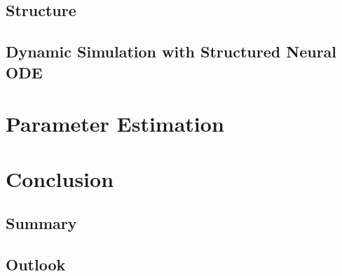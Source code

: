 \documentclass[
	parskip, 			   %
	twoside, 			   %
	DIV=14, 			   %
	BCOR=15.0mm, 		   %
	headsepline, 		   %
	open=right, 		   %
	captions=tableheading, %
	bibliography=totoc,    %
	numbers=noenddot       %
]{scrreprt}
\begin{document}
\section{Structure}
\section{Dynamic Simulation with Structured Neural ODE}

\clearpage
\chapter{Parameter Estimation}


\clearpage
\chapter{Conclusion}
\section{Summary}
\section{Outlook}



\renewcommand{\bibname}{References} %



\appendix
\end{document}
